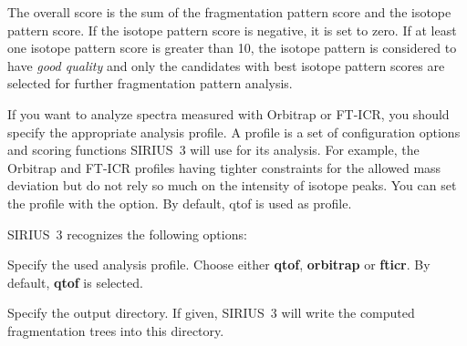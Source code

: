 \documentclass[letterpaper,10pt,openany,oneside]{sphinxmanual}
\begin{document}
The overall score is the sum of the fragmentation pattern score and the isotope pattern score. If the isotope pattern score is negative, it is set to zero. If at least one isotope pattern score is greater than 10, the isotope pattern is considered to have \emph{good quality} and only the candidates with best isotope pattern scores are selected for further fragmentation pattern analysis.

If you want to analyze spectra measured with Orbitrap or FT-ICR, you should specify the appropriate analysis profile. A profile is a set of configuration options and scoring functions SIRIUS~3 will use for its analysis. For example, the Orbitrap and FT-ICR profiles having tighter constraints for the allowed mass deviation but do not rely so much on the intensity of isotope peaks. You can set the profile with the  option. By default, qtof is used as profile.

SIRIUS~3 recognizes the following options:

\begin{fulllineitems}
\label{commandline:cmdoption-p}
Specify the used analysis profile. Choose either \textbf{qtof}, \textbf{orbitrap} or \textbf{fticr}. By default, \textbf{qtof} is selected.

\end{fulllineitems}


\begin{fulllineitems}
\label{commandline:cmdoption-o}
Specify the output directory. If given, SIRIUS~3 will write the computed
fragmentation trees into this directory.

\end{fulllineitems}

\end{document}
